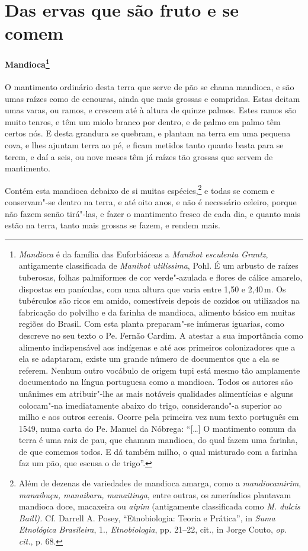 \section{Das ervas que são fruto e se comem}
\paragraph{Mandioca\footnote{ \textit{Mandioca} é da família das
Euforbiáceas a \textit{Manihot esculenta Grantz}, antigamente
classificada de \textit{Manihot utilissima}, Pohl. É um arbusto de
raízes tuberosas, folhas palmiformes de cor verde"-azulada e flores de
cálice amarelo, dispostas em panículas, com uma altura que varia entre
1,50 e 2,40\,m. Os tubérculos são ricos em amido, comestíveis depois de
cozidos ou utilizados na fabricação do polvilho e da farinha de
mandioca, alimento básico em muitas regiões do Brasil. Com esta planta
preparam"-se inúmeras iguarias, como descreve no seu texto o Pe. Fernão
Cardim. A atestar a sua importância como alimento indispensável aos
indígenas e até aos primeiros colonizadores que a ela se adaptaram,
existe um grande número de documentos que a ela se referem. Nenhum 
outro vocábulo de origem tupi está mesmo tão amplamente documentado na
língua portuguesa como a mandioca. Todos os autores são unânimes em
atribuir"-lhe as mais notáveis qualidades alimentícias e alguns 
colocam"-na imediatamente abaixo do trigo, considerando"-a superior ao
milho e aos outros cereais. Ocorre pela primeira vez num texto
português em 1549, numa carta do Pe. Manuel da Nóbrega: ``[\ldots{}] 
O mantimento comum da terra é uma raiz de pau, que chamam
mandioca, do qual fazem uma farinha, de que comemos todos. E dá também
milho, o qual misturado com a farinha faz um pão, que escusa o de
trigo''.}} O mantimento ordinário desta terra que serve de
pão se chama mandioca, e são umas raízes como de cenouras, ainda que
mais grossas e compridas. Estas deitam umas varas, ou ramos, e crescem
até à altura de quinze palmos. Estes ramos são muito tenros, e têm um
miolo branco por dentro, e de palmo em palmo têm certos nós. E desta
grandura se quebram, e plantam na terra em uma pequena cova, e lhes
ajuntam terra ao pé, e ficam metidos tanto quanto basta para se terem,
e daí a seis, ou nove meses têm já raízes tão grossas que servem de mantimento.

 Contém esta mandioca debaixo de si muitas espécies,\footnote{ Além de
dezenas de variedades de mandioca amarga, como a
\textit{mandiocamirim}, \textit{manaibuçu, manaibaru, manaitinga}, 
entre outras, os ameríndios plantavam mandioca doce, macaxeira ou
\textit{aipim} (antigamente classificada como \textit{M. dulcis Baill).} 
Cf. Darrell A. Posey, ``Etnobiologia: Teoria e Prática'', in
\textit{Suma Etnológica Brasileira}, 1., \textit{Etnobiologia}, 
pp. 21--22, cit., in Jorge Couto, \textit{op. cit.}, p. 68.} e todas se comem
e conservam"-se dentro na terra, e até oito anos, e não é necessário
celeiro, porque não fazem senão tirá"-las, e fazer o mantimento fresco
de cada dia, e quanto mais estão na terra, tanto mais grossas se fazem,
e rendem mais.

